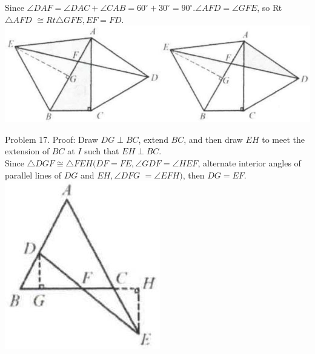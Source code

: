 \documentclass[10pt]{article}
\begin{document}
Since \(\angle D A F=\angle D A C+\angle C A B=60^{\circ}+30^{\circ}=90^{\circ} . \angle A F D=\angle G F E\), so Rt \(\triangle A F D\) \(\cong R t \triangle G F E, E F=F D\).\\
\includegraphics[max width=\textwidth, center]{2025_04_17_97bc1f7e44d93c271a88g-098(1)}

Problem 17. Proof:
Draw \(D G \perp B C\), extend \(B C\), and then draw \(E H\) to meet the extension of \(B C\) at \(I\) such that \(E H \perp B C\).\\
Since \(\triangle D G F \cong \triangle F E H(D F=F E, \angle G D F=\angle H E F\), alternate interior angles of parallel lines of \(D G\) and \(E H, \angle D F G\) \(=\angle E F H)\), then \(D G=E F\).\\
\includegraphics[max width=\textwidth, center]{2025_04_17_97bc1f7e44d93c271a88g-098(2)}
\end{document}
